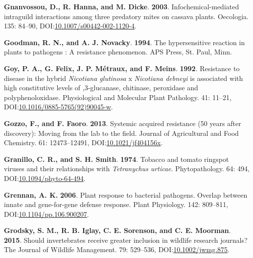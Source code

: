 \documentclass[12pt,final,CPage]{ufthesis}
\newlength{\cslhangindent}
\newenvironment{CSLReferences}[2] %
{%
	\setlength{\parindent}{0pt}
	\ifodd #1 \everypar{\setlength{\hangindent}{\cslhangindent}}\ignorespaces\fi
	\ifnum #2 > 0
	\setlength{\parskip}{#2\baselineskip}
	\fi
}%
{}
\begin{document}
{\begin{CSLReferences}{1}{0}
  \leavevmode{}%
  \textbf{Gnanvossou, D., R. Hanna, and M. Dicke}. \textbf{2003}. Infochemical-mediated intraguild interactions among three predatory mites on cassava plants. Oecologia. 135: 84--90, DOI:\href{https://doi.org/10.1007/s00442-002-1120-4}{10.1007/s00442-002-1120-4}.

  \leavevmode{}%
  \textbf{Goodman, R. N., and A. J. Novacky}. \textbf{1994}. The hypersensitive reaction in plants to pathogens : A resistance phenomenon. APS Press, St. Paul, Minn.

  \leavevmode{}%
  \textbf{Goy, P. A., G. Felix, J. P. Métraux, and F. Meins}. \textbf{1992}. Resistance to disease in the hybrid {\emph{Nicotiana glutinosa}} x {\emph{Nicotiana debneyi}} is associated with high constitutive levels of ,3-glucanase, chitinase, peroxidase and polyphenoloxidase. Physiological and Molecular Plant Pathology. 41: 11--21, DOI:\href{https://doi.org/10.1016/0885-5765(92)90045-w}{10.1016/0885-5765(92)90045-w}.

  \leavevmode{}%
  \textbf{Gozzo, F., and F. Faoro}. \textbf{2013}. Systemic acquired resistance (50 years after discovery): Moving from the lab to the field. Journal of Agricultural and Food Chemistry. 61: 12473--12491, DOI:\href{https://doi.org/10.1021/jf404156x}{10.1021/jf404156x}.

  \leavevmode{}%
  \textbf{Granillo, C. R., and S. H. Smith}. \textbf{1974}. Tobacco and tomato ringspot viruses and their relationships with {\emph{Tetranychus urticae}}. Phytopathology. 64: 494, DOI:\href{https://doi.org/10.1094/phyto-64-494}{10.1094/phyto-64-494}.

  \leavevmode{}%
  \textbf{Grennan, A. K.} \textbf{2006}. Plant response to bacterial pathogens. Overlap between innate and gene-for-gene defense response. Plant Physiology. 142: 809--811, DOI:\href{https://doi.org/10.1104/pp.106.900207}{10.1104/pp.106.900207}.

  \leavevmode{}%
  \textbf{Grodsky, S. M., R. B. Iglay, C. E. Sorenson, and C. E. Moorman}. \textbf{2015}. Should invertebrates receive greater inclusion in wildlife research journals? The Journal of Wildlife Management. 79: 529--536, DOI:\href{https://doi.org/10.1002/jwmg.875}{10.1002/jwmg.875}.


\end{CSLReferences}}
\end{document}
